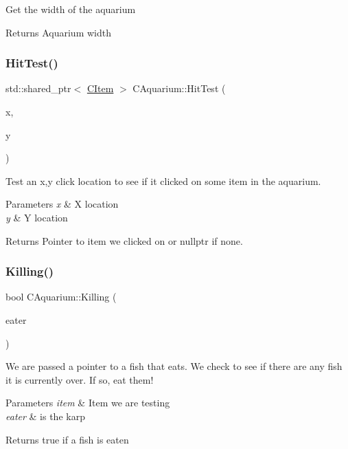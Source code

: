 Get the width of the aquarium \begin{DoxyReturn}{Returns}
Aquarium width 
\end{DoxyReturn}
\mbox{\label{class_c_aquarium_a7129486467e76938fbc049723f9187f3}} 
\subsubsection{\texorpdfstring{Hit\+Test()}{HitTest()}}
{\footnotesize\ttfamily std\+::shared\+\_\+ptr$<$ \mbox{\hyperlink{class_c_item}{C\+Item}} $>$ C\+Aquarium\+::\+Hit\+Test (\begin{DoxyParamCaption}\item[{int}]{x,  }\item[{int}]{y }\end{DoxyParamCaption})}

Test an x,y click location to see if it clicked on some item in the aquarium. 
\begin{DoxyParams}{Parameters}
{\em x} & X location \\
\hline
{\em y} & Y location \\
\hline
\end{DoxyParams}
\begin{DoxyReturn}{Returns}
Pointer to item we clicked on or nullptr if none. 
\end{DoxyReturn}
\mbox{\label{class_c_aquarium_a111b3c61aa0cd3f8bdda1e2bc6b63ed1}} 
\subsubsection{\texorpdfstring{Killing()}{Killing()}}
{\footnotesize\ttfamily bool C\+Aquarium\+::\+Killing (\begin{DoxyParamCaption}\item[{\mbox{\hyperlink{class_c_item}{C\+Item}} $\ast$}]{eater }\end{DoxyParamCaption})}

We are passed a pointer to a fish that eats. We check to see if there are any fish it is currently over. If so, eat them! 
\begin{DoxyParams}{Parameters}
{\em item} & Item we are testing \\
\hline
{\em eater} & is the karp \\
\hline
\end{DoxyParams}
\begin{DoxyReturn}{Returns}
true if a fish is eaten 
\end{DoxyReturn}
\mbox{\label{class_c_aquarium_a21faac4da17cea923d8f7a5cebe45141}} 
